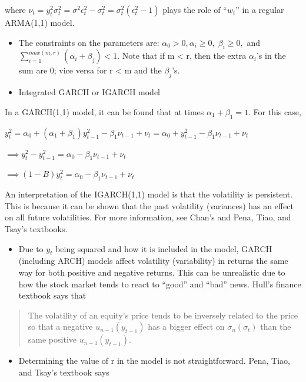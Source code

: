 \documentclass[
]{book}
\providecommand{\tightlist}{%
  \setlength{\itemsep}{0pt}\setlength{\parskip}{0pt}}
\theoremstyle{definition}
\theoremstyle{definition}
\theoremstyle{definition}
\theoremstyle{definition}
\theoremstyle{remark}
\begin{document}
where \(\nu_t=y^2_t\sigma^2_t=\sigma^2\epsilon_t^2-\sigma_t^2=\sigma_t^2(\epsilon_t^2-1)\) plays the role of ``\(w_t\)'' in a regular ARMA(1,1) model.

\begin{itemize}
\tightlist
\item
  The constraints on the parameters are: \(\alpha_0 > 0, \alpha_i \ge 0, \beta_i \ge 0,\) and \(\sum_{i=1}^{max(m,r)}(\alpha_i+\beta_j)<1\). Note that if m \textless{} r, then the extra \(\alpha_i\)'s in the sum are 0; vice versa for r \textless{} m and the \(\beta_j\)'s.
\item
  Integrated GARCH or IGARCH model
\end{itemize}

In a GARCH(1,1) model, it can be found that at times \(\alpha_1 + \beta_1 = 1\). For this case,

\(y_t^2=\alpha_0+(\alpha_1+\beta_1)y^2_{t-1}-\beta_1\nu_{t-1}+\nu_t=\alpha_0+y^2_{t-1}-\beta_1\nu_{t-1}+\nu_t\)

\(\implies y^2_t-y^2_{t-1}=\alpha_0-\beta_1\nu_{t-1}+\nu_t\)

\(\implies (1-B)y^2_t=\alpha_0-\beta_1\nu_{t-1}+\nu_t\)

An interpretation of the IGARCH(1,1) model is that the volatility is persistent. This is because it can be shown that the past volatility (variances) has an effect on all future volatilities. For more information, see Chan's and Pena, Tiao, and Tsay's textbooks.

\begin{itemize}
\tightlist
\item
  Due to \(y_t\) being squared and how it is included in the model, GARCH (including ARCH) models affect volatility (variability) in returns the same way for both positive and negative returns. This can be unrealistic due to how the stock market tends to react to ``good'' and ``bad'' news. Hull's finance textbook says that
\end{itemize}

\begin{quote}
The volatility of an equity's price tends to be inversely related to the price so that a negative \(u_{n-1} (y_{t-1})\) has a bigger effect on \(\sigma_n (\sigma_t)\) than the same positive \(u_{n-1} (y_{t-1})\).
\end{quote}

\begin{itemize}
\tightlist
\item
  Determining the value of r in the model is not straightforward. Pena, Tiao, and Tsay's textbook says
\end{itemize}
\end{document}

